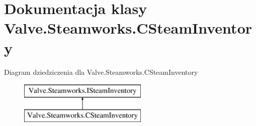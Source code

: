 \hypertarget{class_valve_1_1_steamworks_1_1_c_steam_inventory}{}\section{Dokumentacja klasy Valve.\+Steamworks.\+C\+Steam\+Inventory}
\label{class_valve_1_1_steamworks_1_1_c_steam_inventory}
Diagram dziedziczenia dla Valve.\+Steamworks.\+C\+Steam\+Inventory\begin{figure}[H]
\begin{center}
\leavevmode
\includegraphics[height=2.000000cm]{class_valve_1_1_steamworks_1_1_c_steam_inventory}
\end{center}
\end{figure}

